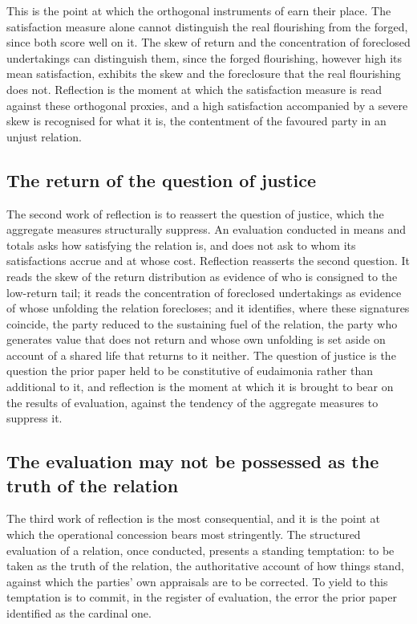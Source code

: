 \noindent
This is the point at which the orthogonal instruments of  earn their place. The satisfaction measure alone cannot distinguish the real flourishing from the forged, since both score well on it. The skew of return and the concentration of foreclosed undertakings can distinguish them, since the forged flourishing, however high its mean satisfaction, exhibits the skew and the foreclosure that the real flourishing does not. Reflection is the moment at which the satisfaction measure is read against these orthogonal proxies, and a high satisfaction accompanied by a severe skew is recognised for what it is, the contentment of the favoured party in an unjust relation.

\subsection{The return of the question of justice}
\label{p11:sec:ref-justice}

The second work of reflection is to reassert the question of justice, which the aggregate measures structurally suppress. An evaluation conducted in means and totals asks how satisfying the relation is, and does not ask to whom its satisfactions accrue and at whose cost. Reflection reasserts the second question. It reads the skew of the return distribution as evidence of who is consigned to the low-return tail; it reads the concentration of foreclosed undertakings as evidence of whose unfolding the relation forecloses; and it identifies, where these signatures coincide, the party reduced to the sustaining fuel of the relation, the party who generates value that does not return and whose own unfolding is set aside on account of a shared life that returns to it neither. The question of justice is the question the prior paper held to be constitutive of eudaimonia rather than additional to it, and reflection is the moment at which it is brought to bear on the results of evaluation, against the tendency of the aggregate measures to suppress it.

\subsection{The evaluation may not be possessed as the truth of the relation}
\label{p11:sec:ref-possession}

The third work of reflection is the most consequential, and it is the point at which the operational concession bears most stringently. The structured evaluation of a relation, once conducted, presents a standing temptation: to be taken as the truth of the relation, the authoritative account of how things stand, against which the parties' own appraisals are to be corrected. To yield to this temptation is to commit, in the register of evaluation, the error the prior paper identified as the cardinal one.

